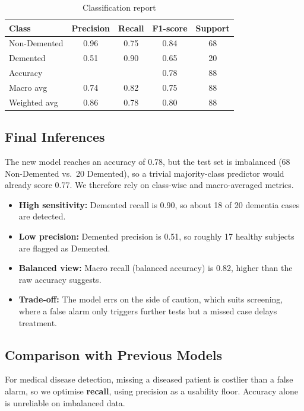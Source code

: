 \documentclass[10pt,twocolumn]{article}
\begin{document}
    \begin{table}[htbp]
        \centering
        \renewcommand{\arraystretch}{1.3}
        \label{tab:classification_report}
        \begin{tabular}{l c c c c}
            \hline
            \textbf{Class} & \textbf{Precision} & \textbf{Recall} & \textbf{F1-score} & \textbf{Support} \\
            \hline
            Non-Demented & 0.96 & 0.75 & 0.84 & 68 \\
            Demented     & 0.51 & 0.90 & 0.65 & 20 \\
            \hline
            Accuracy     &      &      & 0.78 & 88 \\
            Macro avg    & 0.74 & 0.82 & 0.75 & 88 \\
            Weighted avg & 0.86 & 0.78 & 0.80 & 88 \\
            \hline
        \end{tabular}
        \caption{Classification report}
    \end{table}

    \subsection{Final Inferences}


        \noindent
        The new model reaches an accuracy of 0.78, but the test set is imbalanced (68 Non-Demented vs.\ 20 Demented), so a trivial majority-class predictor would already score 0.77. We therefore rely on class-wise and macro-averaged metrics.
        \begin{itemize}[leftmargin=*, itemsep=0pt, topsep=2pt]
            \item \textbf{High sensitivity:} Demented recall is 0.90, so about 18 of 20 dementia cases are detected.
            \item \textbf{Low precision:} Demented precision is 0.51, so roughly 17 healthy subjects are flagged as Demented.
            \item \textbf{Balanced view:} Macro recall (balanced accuracy) is 0.82, higher than the raw accuracy suggests.
            \item \textbf{Trade-off:} The model errs on the side of caution, which suits screening, where a false alarm only triggers further tests but a missed case delays treatment.
        \end{itemize}

    \subsection{Comparison with Previous Models}
        \noindent
        For medical disease detection, missing a diseased patient is costlier than a false alarm, so we optimise \textbf{recall}, using precision as a usability floor. Accuracy alone is unreliable on imbalanced data.
\end{document}
